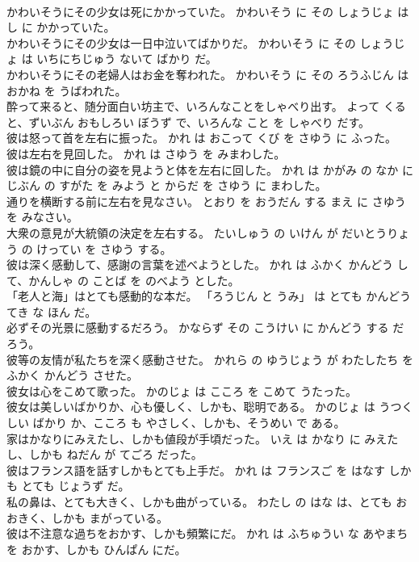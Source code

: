 \documentclass[8pt]{extreport}
\begin{document}
\begin{CJK}{UTF8}{min}
\\	かわいそうにその少女は死にかかっていた。	かわいそう に その しょうじょ は し に かかっていた。	
\\	かわいそうにその少女は一日中泣いてばかりだ。	かわいそう に その しょうじょ は いちにちじゅう ないて ばかり だ。	
\\	かわいそうにその老婦人はお金を奪われた。	かわいそう に その ろうふじん は おかね を うばわれた。	
\\	酔って来ると、随分面白い坊主で、いろんなことをしゃべり出す。	よって くる と、ずいぶん おもしろい ぼうず で、いろんな こと を しゃべり だす。	
\\	彼は怒って首を左右に振った。	かれ は おこって くび を さゆう に ふった。	
\\	彼は左右を見回した。	かれ は さゆう を みまわした。	
\\	彼は鏡の中に自分の姿を見ようと体を左右に回した。	かれ は かがみ の なか に じぶん の すがた を みよう と からだ を さゆう に まわした。	
\\	通りを横断する前に左右を見なさい。	とおり を おうだん する まえ に さゆう を みなさい。	
\\	大衆の意見が大統領の決定を左右する。	たいしゅう の いけん が だいとうりょう の けってい を さゆう する。	
\\	彼は深く感動して、感謝の言葉を述べようとした。	かれ は ふかく かんどう して、かんしゃ の ことば を のべよう とした。	
\\	「老人と海」はとても感動的な本だ。	「ろうじん と うみ」 は とても かんどうてき な ほん だ。	
\\	必ずその光景に感動するだろう。	かならず その こうけい に かんどう する だろう。	
\\	彼等の友情が私たちを深く感動させた。	かれら の ゆうじょう が わたしたち を ふかく かんどう させた。	
\\	彼女は心をこめて歌った。	かのじょ は こころ を こめて うたった。	
\\	彼女は美しいばかりか、心も優しく、しかも、聡明である。	かのじょ は うつくしい ばかり か、こころ も やさしく、しかも、そうめい で ある。	
\\	家はかなりにみえたし、しかも値段が手頃だった。	いえ は かなり に みえたし、しかも ねだん が てごろ だった。	
\\	彼はフランス語を話すしかもとても上手だ。	かれ は フランスご を はなす しかも とても じょうず だ。	
\\	私の鼻は、とても大きく、しかも曲がっている。	わたし の はな は、とても おおきく、しかも まがっている。	
\\	彼は不注意な過ちをおかす、しかも頻繁にだ。	かれ は ふちゅうい な あやまち を おかす、しかも ひんぱん にだ。	

\end{CJK}
\end{document}
